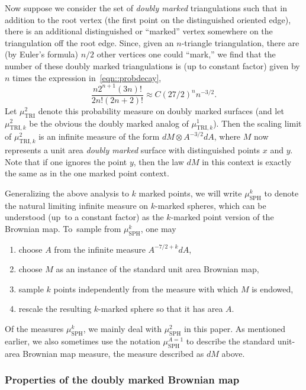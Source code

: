 \documentclass[10pt]{amsart}
\theoremstyle{plain}
\numberwithin{theorem}{section}
\theoremstyle{definition}
\newcommand{\mustwo}{\mu_{\mathrm{SPH}}^2}
\newcommand{\musk}{\mu_{\mathrm{SPH}}^k}
\newcommand{\musa}{{\mu_{\mathrm{SPH}}^{A=1}}}
\begin{document}
Now suppose we consider the set of \emph{doubly marked} triangulations such that in addition to the root vertex (the first point on the distinguished oriented edge), there is an additional distinguished or ``marked'' vertex somewhere on the triangulation off the root edge. Since, given an $n$-triangle triangulation, there are (by Euler's formula) $n/2$ other vertices one could ``mark,'' we find that the number of these doubly marked triangulations is (up to constant factor) given by $n$ times the expression in~\eqref{eqn::probdecay}, \ie
\begin{equation}
\label{eqn::probdecay2}
\frac{n 2^{n+1} (3n)!}{2n! (2n+2)!} \approx C (27/2)^n n^{-3/2}.
\end{equation}
Let $\mu^2_{\mathrm{TRI}}$ denote this probability measure on doubly marked surfaces (and let $\mu^2_{\mathrm{TRI},k}$ be the obvious the doubly marked analog of $\mu^1_{\mathrm{TRI},k}$). Then the scaling limit of $\mu^2_{\mathrm{TRI},k}$ is an infinite measure of the form $dM \otimes A^{-3/2} dA$, where $M$ now represents a unit area \emph{doubly marked} surface with distinguished points $x$ and $y$. Note that if one ignores the point $y$, then the law $dM$ in this context is exactly the same as in the one marked point context.

Generalizing the above analysis to $k$ marked points, we will write $\musk$ to denote the natural limiting infinite measure on $k$-marked spheres, which can be understood (up~to a constant factor) as the $k$-marked point version of the Brownian map. To~sample from $\musk$, one may
\begin{enumerate}
\item choose $A$ from the infinite measure $A^{-7/2 + k}dA$,
\item choose $M$ as an instance of the standard unit area Brownian map,
\item sample $k$ points independently from the measure with which $M$ is endowed,
\item rescale the resulting $k$-marked sphere so that it has area $A$.
\end{enumerate}
Of the measures $\musk$, we mainly deal with $\mustwo$ in this paper. As mentioned earlier, we also sometimes use the notation $\musa$ to describe the standard unit-area Brownian map measure, \ie the measure described as $dM$ above.

\subsubsection{Properties of the doubly marked Brownian map}
\label{subsubsec::doublymarkedproperties}
\end{document}

